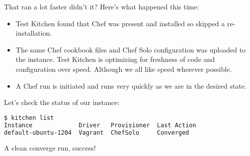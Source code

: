 That ran a lot faster didn't it? Here's what happened this time:

\begin{itemize}
  \item Test Kitchen found that Chef was present and installed so skipped a re-installation.
  \item The same Chef cookbook files and Chef Solo configuration was uploaded to the instance. Test Kitchen is optimizing for freshness of code and configuration over speed. Although we all like speed wherever possible.
  \item A Chef run is initiated and runs very quickly as we are in the desired state.
\end{itemize}

Let's check the status of our instance:

\begin{lstlisting}[language=Bash,label=lst:testing-test-kitchen11]
$ kitchen list
Instance             Driver   Provisioner  Last Action
default-ubuntu-1204  Vagrant  ChefSolo     Converged
\end{lstlisting}

A clean converge run, success!
